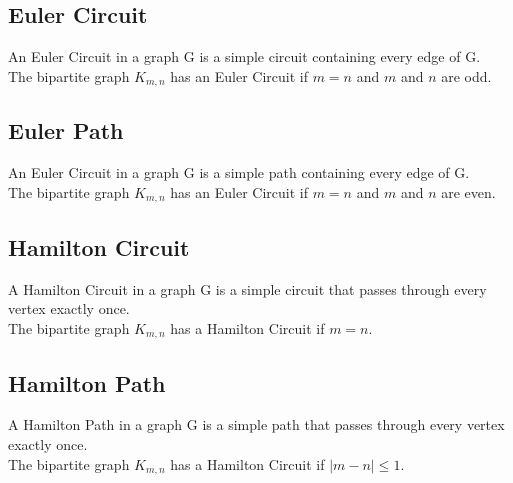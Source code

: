 \documentclass[10pt,reqno,sumlimits]{amsart}
\theoremstyle{plain}
\theoremstyle{definition}
\newcommand{\1}{{\bf 1}}
\numberwithin{equation}{section}
\begin{document}
\section{}
\subsection{Euler Circuit}
An Euler Circuit in a graph G is a simple circuit containing every edge of G.\\
The bipartite graph $K_{m,n}$ has an Euler Circuit if $m = n$ and $m$ and $n$ are odd.\\
\subsection{Euler Path}
An Euler Circuit in a graph G is a simple path containing every edge of G.\\
The bipartite graph $K_{m,n}$ has an Euler Circuit if $m = n$ and $m$ and $n$ are even.\\
\subsection{Hamilton Circuit}
A Hamilton Circuit in a graph G is a simple circuit that passes through every vertex exactly once.\\
The bipartite graph $K_{m,n}$ has a Hamilton Circuit if $m = n$.\\
\subsection{Hamilton Path}
A Hamilton Path in a graph G is a simple path that passes through every vertex exactly once.\\
The bipartite graph $K_{m,n}$ has a Hamilton Circuit if $|m - n| \leq 1$.\\
\end{document}
